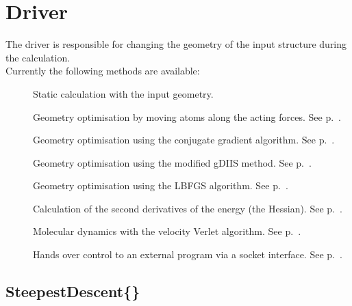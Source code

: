 \section{Driver}
\label{sec:dftbp.Driver}

The driver is responsible for changing the geometry of the input
structure during the calculation.\\ \bigskip Currently the following
methods are available:
\begin{description}
\item[\iscb{}] Static calculation with the input geometry.
\item[] Geometry optimisation by moving atoms
  along the acting forces. See p.~.
\item[] Geometry optimisation using the
  conjugate gradient algorithm. See p.~.
\item[] Geometry optimisation using the modified gDIIS
  method. See p.~.
\item[] Geometry optimisation using the LBFGS
  algorithm. See p.~.
\item[] Calculation of the second derivatives of the
  energy (the Hessian). See p.~.
\item[] Molecular dynamics with the velocity
  Verlet algorithm. See p.~.
\item[] Hands over control to an external program via a socket
  interface. See p.~.
\end{description}


\subsection{SteepestDescent\{\}}
\label{sec:dftbp.SteepestDescent}

